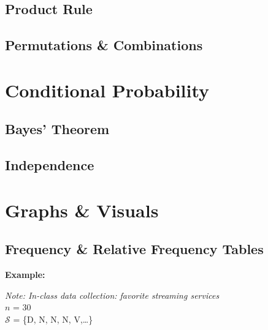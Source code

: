 \documentclass[12pt]{article}
\begin{document}
\subsection{Product Rule}

\subsection{Permutations \& Combinations}

\section{Conditional Probability}

\subsection{Bayes' Theorem}

\subsection{Independence}

\section{Graphs \& Visuals}

\subsection{Frequency \& Relative Frequency Tables}

\textbf{Example:}
\begin{flushleft}
    \textit{Note: In-class data collection: favorite streaming services} \\
    \(n\) = 30 \\
    $\mathcal{S}$ = \{D, N, N, N, V,\ldots\}
\end{flushleft}
\end{document}
